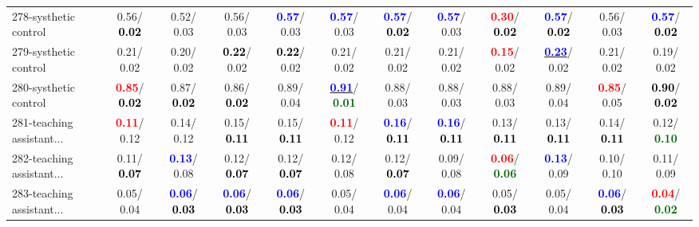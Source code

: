 \begin{table}[h]
\begin{center}
{\begin{tabular}{lc|c|c|c|c|c|c|c|c|c|c}
278-systhetic control &   0.56/\textcolor{black}{\textbf{  0.02}} &   0.52/  0.03 &   0.56/  0.03 & \textcolor{blue}{\textbf{  0.57}}/  0.03 & \textcolor{blue}{\textbf{  0.57}}/  0.03 & \textcolor{blue}{\textbf{  0.57}}/\textcolor{black}{\textbf{  0.02}} & \textcolor{blue}{\textbf{  0.57}}/  0.03 & \textcolor{red}{\textbf{  0.30}}/\textcolor{black}{\textbf{  0.02}} & \textcolor{blue}{\textbf{  0.57}}/\textcolor{black}{\textbf{  0.02}} &   0.56/  0.03 & \textcolor{blue}{\textbf{  0.57}}/\textcolor{black}{\textbf{  0.02}} \\
279-systhetic control &   0.21/  0.02 &   0.20/  0.02 & \textcolor{black}{\textbf{  0.22}}/  0.02 & \textcolor{black}{\textbf{  0.22}}/  0.02 &   0.21/  0.02 &   0.21/  0.02 &   0.21/  0.02 & \textcolor{red}{\textbf{  0.15}}/  0.02 & \underline{\textcolor{blue}{\textbf{  0.23}}}/  0.02 &   0.21/  0.02 &   0.19/  0.02 \\
280-systhetic control & \textcolor{red}{\textbf{  0.85}}/\textcolor{black}{\textbf{  0.02}} &   0.87/\textcolor{black}{\textbf{  0.02}} &   0.86/\textcolor{black}{\textbf{  0.02}} &   0.89/  0.04 & \underline{\textcolor{blue}{\textbf{  0.91}}}/\textcolor{darkgreen}{\textbf{  0.01}} &   0.88/  0.03 &   0.88/  0.03 &   0.88/  0.03 &   0.89/  0.04 & \textcolor{red}{\textbf{  0.85}}/  0.05 & \textcolor{black}{\textbf{  0.90}}/\textcolor{black}{\textbf{  0.02}} \\
281-teaching assistant... & \textcolor{red}{\textbf{  0.11}}/  0.12 &   0.14/  0.12 &   0.15/\textcolor{black}{\textbf{  0.11}} &   0.15/\textcolor{black}{\textbf{  0.11}} & \textcolor{red}{\textbf{  0.11}}/  0.12 & \textcolor{blue}{\textbf{  0.16}}/\textcolor{black}{\textbf{  0.11}} & \textcolor{blue}{\textbf{  0.16}}/\textcolor{black}{\textbf{  0.11}} &   0.13/\textcolor{black}{\textbf{  0.11}} &   0.13/\textcolor{black}{\textbf{  0.11}} &   0.14/\textcolor{black}{\textbf{  0.11}} &   0.12/\textcolor{darkgreen}{\textbf{  0.10}} \\
282-teaching assistant... &   0.11/\textcolor{black}{\textbf{  0.07}} & \textcolor{blue}{\textbf{  0.13}}/  0.08 &   0.12/\textcolor{black}{\textbf{  0.07}} &   0.12/\textcolor{black}{\textbf{  0.07}} &   0.12/  0.08 &   0.12/\textcolor{black}{\textbf{  0.07}} &   0.09/  0.08 & \textcolor{red}{\textbf{  0.06}}/\textcolor{darkgreen}{\textbf{  0.06}} & \textcolor{blue}{\textbf{  0.13}}/  0.09 &   0.10/  0.10 &   0.11/  0.09 \\
283-teaching assistant... &   0.05/  0.04 & \textcolor{blue}{\textbf{  0.06}}/\textcolor{black}{\textbf{  0.03}} & \textcolor{blue}{\textbf{  0.06}}/\textcolor{black}{\textbf{  0.03}} & \textcolor{blue}{\textbf{  0.06}}/\textcolor{black}{\textbf{  0.03}} &   0.05/  0.04 & \textcolor{blue}{\textbf{  0.06}}/  0.04 & \textcolor{blue}{\textbf{  0.06}}/  0.04 &   0.05/\textcolor{black}{\textbf{  0.03}} &   0.05/  0.04 & \textcolor{blue}{\textbf{  0.06}}/\textcolor{black}{\textbf{  0.03}} & \textcolor{red}{\textbf{  0.04}}/\textcolor{darkgreen}{\textbf{  0.02}} \\

\end{tabular}}
\end{center}
\end{table}
